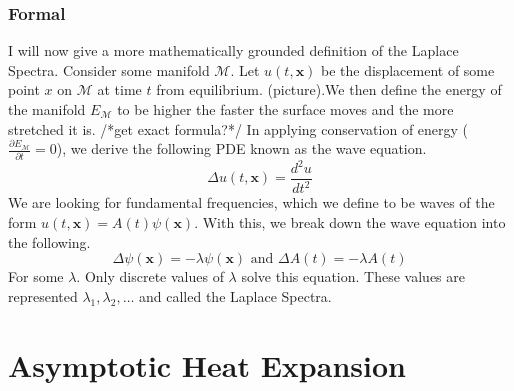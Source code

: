 \documentclass{article}
\newcommand{\pder}[2]{\frac{\partial#1}{\partial#2}}
\begin{document}
\subsubsection{Formal}
I will now give a more mathematically grounded definition of the Laplace Spectra. Consider some manifold $\mathcal{M}$. Let $u(t,\mathbf{x})$ be the displacement of some point $x$ on $\mathcal{M}$ at time $t$ from equilibrium. (picture).We then define the energy of the manifold $E_{\mathcal{M}}$ to be higher the faster the surface moves and the more stretched it is. /*get exact formula?*/ In applying conservation of energy ($\pder{E_{\mathcal{M}}}{t} = 0$), we derive the following PDE known as the wave equation.
\begin{equation}\label{eq:test}
    \Delta u(t,\mathbf{x}) = \frac{d^2 u}{dt^2}
\end{equation}
We are looking for fundamental frequencies, which we define to be waves of the form $u(t,\mathbf{x}) = A(t)\psi(\mathbf{x})$. With this, we break down the wave equation into the following.
\begin{equation}
    \Delta \psi(\mathbf{x}) = -\lambda \psi(\mathbf{x})
    \text{ and }
    \Delta A(t) = -\lambda A(t)
\end{equation}
For some $\lambda$. Only discrete values of $\lambda$ solve this equation. These values are represented $\lambda_1, \lambda_2, \dots$ and called the Laplace Spectra.

\section{Asymptotic Heat Expansion}
\end{document}
